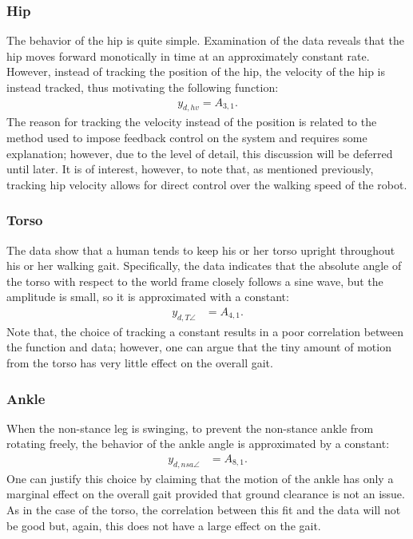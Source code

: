 \subsubsection{Hip}

The behavior of the hip is quite simple.
%
Examination of the data reveals that the hip moves forward monotically in time
at an approximately constant rate.
%
However, instead of tracking the position of the hip, the velocity of the hip is
instead tracked, thus motivating the following function:
%
\begin{align*}
  y_{d,hv} = A_{3,1}.
\end{align*}
%
The reason for tracking the velocity instead of the position is related to the
method used to impose feedback control on the system and requires some
explanation; however, due to the level of detail, this discussion will be
deferred until later.
%
It is of interest, however, to note that, as mentioned previously, tracking hip
velocity allows for direct control over the walking speed of the robot.


\subsubsection{Torso}

The data show that a human tends to keep his or her torso upright throughout his
or her walking gait.
%
Specifically, the data indicates that the absolute angle of the torso with
respect to the world frame closely follows a sine wave, but the amplitude is
small, so it is approximated with a constant:
%
\begin{align*}
  y_{d,T\angle} &= A_{4,1}.
\end{align*}
%
Note that, the choice of tracking a constant results in a poor correlation
between the function and data; however, one can argue that the tiny amount of
motion from the torso has very little effect on the overall gait.


\subsubsection{Ankle}

When the non-stance leg is swinging, to prevent the non-stance ankle from
rotating freely, the behavior of the ankle angle is approximated by a constant:
%
\begin{align*}
  y_{d,nsa\angle} &= A_{8,1}.
\end{align*}
%
One can justify this choice by claiming that the motion of the ankle has only a
marginal effect on the overall gait provided that ground clearance is not an
issue.
%
As in the case of the torso, the correlation between this fit and the data will
not be good but, again, this does not have a large effect on the gait.


